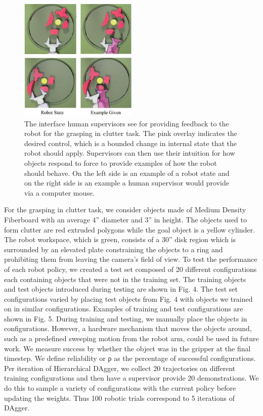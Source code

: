\documentclass[10pt, conference]{ieeeconf}      %
\begin{document}
\begin{figure}[t]
\centering

\includegraphics[width=0.5\textwidth]{f_figs/labeling_interface.png}

\caption{\footnotesize  The interface human supervisors see for providing feedback to the robot for the grasping in clutter task. The pink overlay indicates the desired 
control, which is a bounded change in internal state that the robot should apply.
Supervisors can then use their intuition for how objects respond to force
to provide examples of how the robot should behave. On the left side is
an example of a robot state and on the right side is an example a human
supervisor would provide via a computer mouse.}

\label{fig:labeling_interface}
\end{figure}

For the grasping in clutter task, we consider objects made
of Medium Density Fiberboard with an average 4” diameter
and 3” in height. The objects used to form clutter are red
extruded polygons while the goal object is a yellow cylinder.
The robot workspace, which is green, consists of a 30” disk
region which is surrounded by an elevated plate constraining
the objects to a ring and prohibiting them from leaving the
camera’s field of view.
To test the performance of each robot policy, we created
a test set composed of 20 different configurations each
containing objects that were not in the training set. The
training objects and test objects introduced during testing are
shown in Fig. 4. The test set configurations varied by placing
test objects from Fig. 4 with objects we trained on in similar
configurations. Examples of training and test configurations
are shown in Fig. 5. During training and testing, we manually
place the objects in configurations. However, a hardware
mechanism that moves the objects around, such as a predefined
sweeping motion from the robot arm, could be used
in future work. We measure success by whether the object
was in the gripper at the final timestep. We define reliability
or ρ as the percentage of successful configurations.
Per iteration of Hierarchical DAgger, we collect 20 trajectories
on different training configurations and then have a
supervisor provide 20 demonstrations. We do this to sample
a variety of configurations with the current policy before
updating the weights. Thus 100 robotic trials correspond to
5 iterations of DAgger.
\end{document}
